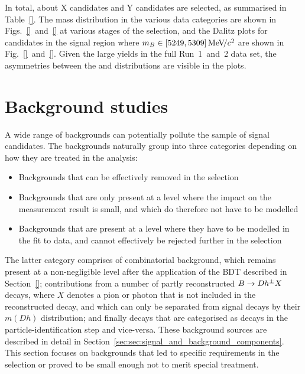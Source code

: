 In total, about X \BtoDK candidates and Y \BtoDpi candidates are selected, as summarised in Table~\ref{}. The \B mass distribution in the various data categories are shown in Figs.~\ref{}~and~\ref{} at various stages of the selection, and the Dalitz plots for candidates in the signal region where $m_B\in[5249, 5309]\text{\,Me\kern -0.1em V\!/}c^2$ are shown in Fig.~\ref{}~and~\ref{}. Given the large yields in the full Run~1~and~2 \lhcb data set, the asymmetries between the \Bp and \Bm distributions are visible in the \BtoDK plots.






\section{Background studies} %
\label{sec:background_studies}

A wide range of backgrounds can potentially pollute the sample of signal candidates. The backgrounds naturally group into three categories depending on how they are treated in the analysis: 
\begin{itemize}
    \item Backgrounds that can be effectively removed in the selection
    \item Backgrounds that are only present at a level where the impact on the measurement result is small, and which do therefore not have to be modelled
    \item Backgrounds that are present at a level where they have to be modelled in the fit to data, and cannot effectively be rejected further in the selection
\end{itemize}
The latter category comprises of combinatorial background, which remains present at a non-negligible level after the application of the BDT described in Section~\ref{};  contributions from a number of partly reconstructed ${B}\rightarrow{\ensuremath{D}} h^\pm X$ decays, where $X$ denotes a pion or photon that is not included in the reconstructed decay, and which can only be separated from signal decays by their $m(Dh)$ distribution; and finally \BtoDpi decays that are categorised as \BtoDK decays in the particle-identification step and vice-versa. These background sources are described in detail in Section~\ref{sec:sec:signal_and_background_components}. This section focuses on backgrounds that led to specific requirements in the selection or proved to be small enough not to merit special treatment.

